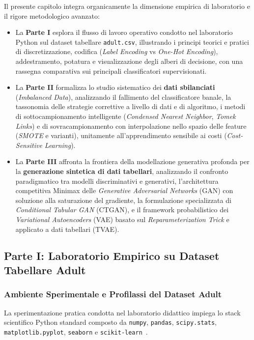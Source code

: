 Il presente capitolo integra organicamente la dimensione empirica di laboratorio e il rigore metodologico avanzato:
\begin{itemize}
    \item La \textbf{Parte I} esplora il flusso di lavoro operativo condotto nel laboratorio Python sul dataset tabellare \texttt{adult.csv}, illustrando i principi teorici e pratici di discretizzazione, codifica (\textit{Label Encoding} vs \textit{One-Hot Encoding}), addestramento, potatura e visualizzazione degli alberi di decisione, con una rassegna comparativa sui principali classificatori supervisionati.
    \item La \textbf{Parte II} formalizza lo studio sistematico dei \textbf{dati sbilanciati} (\textit{Imbalanced Data}), analizzando il fallimento del classificatore banale, la tassonomia delle strategie correttive a livello di dati e di algoritmo, i metodi di sottocampionamento intelligente (\textit{Condensed Nearest Neighbor}, \textit{Tomek Links}) e di sovracampionamento con interpolazione nello spazio delle feature (\textit{SMOTE} e varianti), unitamente all'apprendimento sensibile ai costi (\textit{Cost-Sensitive Learning}).
    \item La \textbf{Parte III} affronta la frontiera della modellazione generativa profonda per la \textbf{generazione sintetica di dati tabellari}, analizzando il confronto paradigmatico tra modelli discriminativi e generativi, l'architettura competitiva Minimax delle \textit{Generative Adversarial Networks} (GAN) con soluzione alla saturazione del gradiente, la formulazione specializzata di \textit{Conditional Tabular GAN} (CTGAN), e il framework probabilistico dei \textit{Variational Autoencoders} (VAE) basato sul \textit{Reparameterization Trick} e applicato a dati tabellari (TVAE).
\end{itemize}
\FloatBarrier
\subsection{Parte I: Laboratorio Empirico su Dataset Tabellare Adult}
\label{sec:dm-lab-adult}

\FloatBarrier
\subsubsection{Ambiente Sperimentale e Profilassi del Dataset Adult}
\label{subsec:dm-lab-dataset}

La sperimentazione pratica condotta nel laboratorio didattico impiega lo stack scientifico Python standard composto da \texttt{numpy}, \texttt{pandas}, \texttt{scipy.stats}, \texttt{matplotlib.pyplot}, \texttt{seaborn} e \texttt{scikit-learn}~\cite{mannocci2026imbalanced}.

